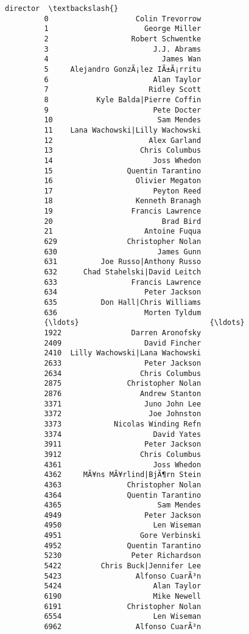 \documentclass[11pt]{article}
\begin{document}
\begin{Verbatim}[commandchars=\\\{\}]
                                     director  \textbackslash{}
         0                    Colin Trevorrow   
         1                      George Miller   
         2                   Robert Schwentke   
         3                        J.J. Abrams   
         4                          James Wan   
         5     Alejandro GonzÃ¡lez IÃ±Ã¡rritu   
         6                        Alan Taylor   
         7                       Ridley Scott   
         8           Kyle Balda|Pierre Coffin   
         9                        Pete Docter   
         10                        Sam Mendes   
         11    Lana Wachowski|Lilly Wachowski   
         12                      Alex Garland   
         13                    Chris Columbus   
         14                       Joss Whedon   
         15                 Quentin Tarantino   
         16                   Olivier Megaton   
         17                       Peyton Reed   
         18                   Kenneth Branagh   
         19                  Francis Lawrence   
         20                         Brad Bird   
         21                     Antoine Fuqua   
         629                Christopher Nolan   
         630                       James Gunn   
         631          Joe Russo|Anthony Russo   
         632      Chad Stahelski|David Leitch   
         633                 Francis Lawrence   
         634                    Peter Jackson   
         635          Don Hall|Chris Williams   
         636                    Morten Tyldum   
         {\ldots}                              {\ldots}   
         1922                Darren Aronofsky   
         2409                   David Fincher   
         2410  Lilly Wachowski|Lana Wachowski   
         2633                   Peter Jackson   
         2634                  Chris Columbus   
         2875               Christopher Nolan   
         2876                  Andrew Stanton   
         3371                   Juno John Lee   
         3372                    Joe Johnston   
         3373            Nicolas Winding Refn   
         3374                     David Yates   
         3911                   Peter Jackson   
         3912                  Chris Columbus   
         4361                     Joss Whedon   
         4362     MÃ¥ns MÃ¥rlind|BjÃ¶rn Stein   
         4363               Christopher Nolan   
         4364               Quentin Tarantino   
         4365                      Sam Mendes   
         4949                   Peter Jackson   
         4950                     Len Wiseman   
         4951                  Gore Verbinski   
         4952               Quentin Tarantino   
         5230                Peter Richardson   
         5422         Chris Buck|Jennifer Lee   
         5423                 Alfonso CuarÃ³n   
         5424                     Alan Taylor   
         6190                     Mike Newell   
         6191               Christopher Nolan   
         6554                     Len Wiseman   
         6962                 Alfonso CuarÃ³n   
         

\end{Verbatim}
\end{document}
